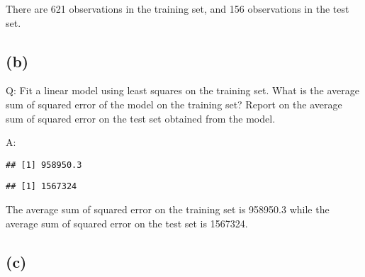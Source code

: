 \documentclass[
]{article}
\newenvironment{Shaded}{\begin{snugshade}}{\end{snugshade}}
\newcommand{\CommentTok}[1]{\textcolor[rgb]{0.56,0.35,0.01}{\textit{#1}}}
\newcommand{\DataTypeTok}[1]{\textcolor[rgb]{0.13,0.29,0.53}{#1}}
\newcommand{\DecValTok}[1]{\textcolor[rgb]{0.00,0.00,0.81}{#1}}
\newcommand{\KeywordTok}[1]{\textcolor[rgb]{0.13,0.29,0.53}{\textbf{#1}}}
\newcommand{\NormalTok}[1]{#1}
\newcommand{\OperatorTok}[1]{\textcolor[rgb]{0.81,0.36,0.00}{\textbf{#1}}}
\newcommand{\StringTok}[1]{\textcolor[rgb]{0.31,0.60,0.02}{#1}}
\begin{document}
There are 621 observations in the training set, and 156 observations in
the test set.

\hypertarget{fourb}{%
\subsection{(b)}\label{fourb}}

Q: Fit a linear model using least squares on the training set. What is
the average sum of squared error of the model on the training set?
Report on the average sum of squared error on the test set obtained from
the model.

A:

\begin{Shaded}
\end{Shaded}

\begin{verbatim}
## [1] 958950.3
\end{verbatim}

\begin{Shaded}
\end{Shaded}

\begin{verbatim}
## [1] 1567324
\end{verbatim}

The average sum of squared error on the training set is 958950.3 while
the average sum of squared error on the test set is 1567324.

\hypertarget{c-2}{%
\subsection{(c)}\label{c-2}}
\end{document}
